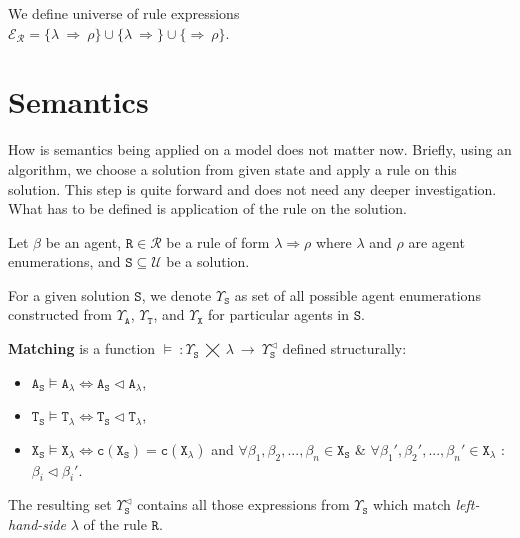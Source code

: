 \documentclass{entcs}
\renewcommand{\~}[0]{\texttildelow}
\begin{document}
\begin{theorem}
We define universe of rule expressions\\ $\mathcal{E}_\mathcal{R} = \{ \lambda ~\Rightarrow~ \rho \} \cup \{ \lambda ~\Rightarrow  \} \cup \{ \Rightarrow~ \rho \}$.
\end{theorem}

\section{Semantics}

How is semantics being applied on a model does not matter now. Briefly, using an algorithm, we choose a solution from given state and apply a rule on this solution. This step is quite forward and does not need any deeper investigation. What has to be defined is application of the rule on the solution.

Let $\beta$ be an agent, $\mathtt{R} \in \mathcal{R}$ be a rule of form $\lambda \Rightarrow \rho$ where $\lambda$ and $\rho$ are agent enumerations, and $\mathtt{S} \subseteq \mathcal{U}$ be a solution. 

\begin{definition}
For a given solution $\mathtt{S}$, we denote $\Upsilon_\mathtt{S}$ as set of all possible agent enumerations constructed from $\Upsilon_\mathtt{A}$, $\Upsilon_\mathtt{T}$, and $\Upsilon_\mathtt{X}$ for particular agents in $\mathtt{S}$.
\end{definition}

\begin{definition}
$ $ \\
\textbf{Matching} is a function $\models ~: \Upsilon_\mathtt{S}~\bigtimes~\lambda~\rightarrow~\Upsilon_\mathtt{S}^{\lhd}$ defined structurally:

\begin{itemize}
	\item $\mathtt{A}_\mathtt{S} \models \mathtt{A}_{\lambda} \Leftrightarrow \mathtt{A}_\mathtt{S} \lhd \mathtt{A}_{\lambda}$,
	\item $\mathtt{T}_\mathtt{S} \models \mathtt{T}_{\lambda} \Leftrightarrow \mathtt{T}_\mathtt{S} \lhd \mathtt{T}_{\lambda}$,
	\item $\mathtt{X}_\mathtt{S} \models \mathtt{X}_{\lambda} \Leftrightarrow \mathtt{c}(\mathtt{X}_\mathtt{S}) = \mathtt{c}(\mathtt{X}_{\lambda})$ and $\forall \beta_1, \beta_2, ..., \beta_n \in \mathtt{X}_\mathtt{S} $ \& $\forall \beta_1', \beta_2', ..., \beta_n' \in \mathtt{X}_{\lambda}$ : $\beta_i \lhd \beta_i'$.
	
\end{itemize}
\noindent The resulting set $\Upsilon_\mathtt{S}^{\lhd}$ contains all those expressions from $\Upsilon_\mathtt{S}$ which match \emph{left-hand-side} $\lambda$ of the rule $\mathtt{R}$.

\end{definition}
\end{document}
